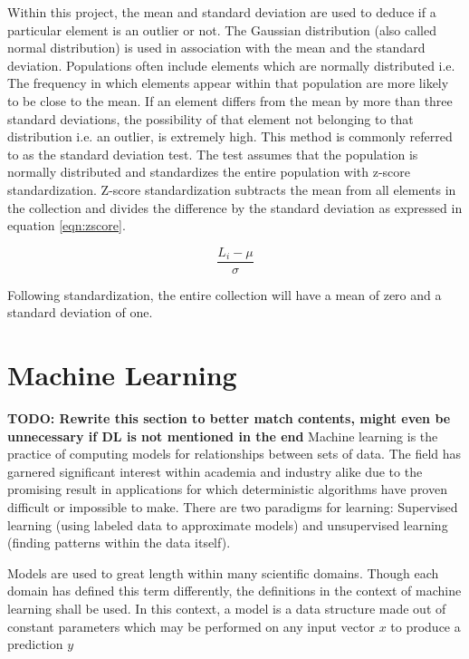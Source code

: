 Within this project, the mean and standard deviation are used to deduce if a particular element is an outlier or not. The Gaussian distribution (also called normal distribution) is used in association with the mean and the standard deviation. Populations often include elements which are normally distributed i.e. The frequency in which elements appear within that population are more likely to be close to the mean. If an element differs from the mean by more than three standard deviations, the possibility of that element not belonging to that distribution i.e. an outlier,  is extremely high. This method is commonly referred to as the standard deviation test. The test assumes that the population is normally distributed and standardizes the entire population with z-score standardization. Z-score standardization subtracts the mean from all elements in the collection and divides the difference by the standard deviation as expressed in equation \ref{eqn:zscore}.

\begin{equation}
\label{eqn:zscore}
 \frac{L_i - \mu} {\sigma}
\end{equation}

Following standardization, the entire collection will have a mean of zero and a standard deviation of one. 

\section{Machine Learning}

\textbf{TODO: Rewrite this section to better match contents, might even be unnecessary if DL is not mentioned in the end}
Machine learning is the practice of computing models for relationships between sets of data. The field has garnered significant interest within academia and industry alike due to the promising result in applications for which deterministic algorithms have proven difficult or impossible to make. There are two paradigms for learning: Supervised learning (using labeled data to approximate models) and unsupervised learning (finding patterns within the data itself). 

Models are used to great length within many scientific domains. Though each domain has defined this term differently, the definitions in the context of machine learning shall be used. In this context, a model is a data structure made out of constant parameters which may be performed on any input vector $x$ to produce a prediction $y$

\vspace{5mm}

